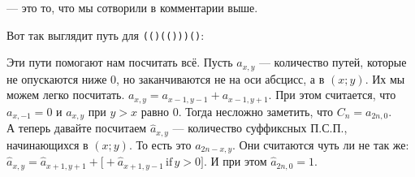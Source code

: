 \documentclass{article}
\begin{document}
\begin{itemize}
\begin{Comment}
        \end{Comment}
        \dfn {} --- это то, что мы сотворили в комментарии выше.
        \begin{Example}
            Вот так выглядит путь для \texttt{(()(()))()}:
            \begin{center}
            \end{center}
        \end{Example}
        \begin{Comment}
            Эти пути помогают нам посчитать всё. Пусть $a_{x,y}$ --- количество путей, которые не опускаются ниже 0, но заканчиваются не на оси абсцисс, а в $(x;y)$. Их мы можем легко посчитать. $a_{x,y}=a_{x-1,y-1}+a_{x-1,y+1}$. При этом считается, что $a_{x,-1}=0$ и $a_{x,y}$ при $y>x$ равно 0. Тогда несложно заметить, что $C_n=a_{2n,0}$.\\
            А теперь давайте посчитаем $\hat a_{x,y}$ --- количество суффиксных П.С.П., начинающихся в $(x;y)$. То есть это $a_{2n-x,y}$. Они считаются чуть ли не так же: $\hat a_{x,y}=\hat a_{x+1,y+1}+\bigg[+\hat a_{x+1,y-1}\,\mathrm{if}\,y>0\bigg]$. И при этом $\hat a_{2n,0}=1$.
        \end{Comment}
        \begin{Comment}

\end{Comment}
\end{itemize}
\end{document}
